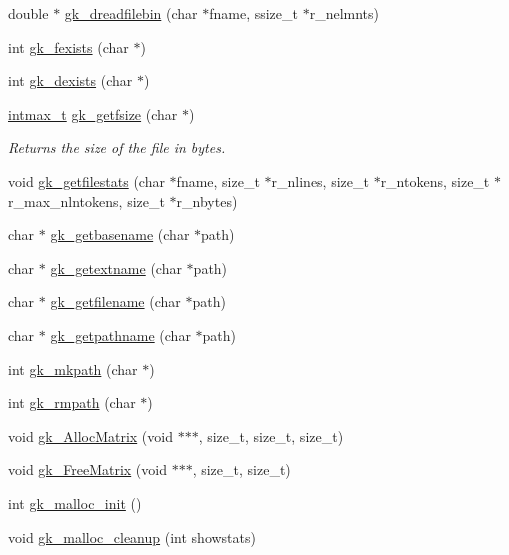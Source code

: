 \begin{DoxyCompactItemize}
\item 
double $\ast$ \hyperlink{a00077_a2a9dbcb6a3f167b0fd20e431612e5aa9}{gk\+\_\+dreadfilebin} (char $\ast$fname, ssize\+\_\+t $\ast$r\+\_\+nelmnts)
\item 
int \hyperlink{a00077_a2b4d5764f4c9b2423033493be5ad91de}{gk\+\_\+fexists} (char $\ast$)
\item 
int \hyperlink{a00077_a8bd20082c884a5605d8d28867d1ddbb5}{gk\+\_\+dexists} (char $\ast$)
\item 
\hyperlink{a00119_a036cd61bb4b30bb510b9538af4cebd1d}{intmax\+\_\+t} \hyperlink{a00077_a2df84c581bac9b89dbfcca4767bdcc36}{gk\+\_\+getfsize} (char $\ast$)
\begin{DoxyCompactList}\small\item\em Returns the size of the file in bytes. \end{DoxyCompactList}\item 
void \hyperlink{a00077_a739112cb142f2e96d6952140c66cd31c}{gk\+\_\+getfilestats} (char $\ast$fname, size\+\_\+t $\ast$r\+\_\+nlines, size\+\_\+t $\ast$r\+\_\+ntokens, size\+\_\+t $\ast$r\+\_\+max\+\_\+nlntokens, size\+\_\+t $\ast$r\+\_\+nbytes)
\item 
char $\ast$ \hyperlink{a00077_ad732cbb6372e1eb9b396792f700091a5}{gk\+\_\+getbasename} (char $\ast$path)
\item 
char $\ast$ \hyperlink{a00077_a4d728cd9869792eb93b315f949819d99}{gk\+\_\+getextname} (char $\ast$path)
\item 
char $\ast$ \hyperlink{a00077_a742e52c08aa7e46acd66cde95045d935}{gk\+\_\+getfilename} (char $\ast$path)
\item 
char $\ast$ \hyperlink{a00077_a1240fb254ce7cf24839fa5bb4ba20ff9}{gk\+\_\+getpathname} (char $\ast$path)
\item 
int \hyperlink{a00077_a89ed36115845151f1a66acabbf6b2284}{gk\+\_\+mkpath} (char $\ast$)
\item 
int \hyperlink{a00077_a046321bd701b2bd8f1fc8619fb8e0512}{gk\+\_\+rmpath} (char $\ast$)
\item 
void \hyperlink{a00077_a3b473198519d20a1558f436cff6029e0}{gk\+\_\+\+Alloc\+Matrix} (void $\ast$$\ast$$\ast$, size\+\_\+t, size\+\_\+t, size\+\_\+t)
\item 
void \hyperlink{a00077_a24f17b8016f192e6e6dfc6e9bf7be10d}{gk\+\_\+\+Free\+Matrix} (void $\ast$$\ast$$\ast$, size\+\_\+t, size\+\_\+t)
\item 
int \hyperlink{a00077_a24633cc1c72a7e92836912c2adcf570a}{gk\+\_\+malloc\+\_\+init} ()
\item 
void \hyperlink{a00077_a47156a22528b5bc8c7c6e9849af34e62}{gk\+\_\+malloc\+\_\+cleanup} (int showstats)

\end{DoxyCompactItemize}
